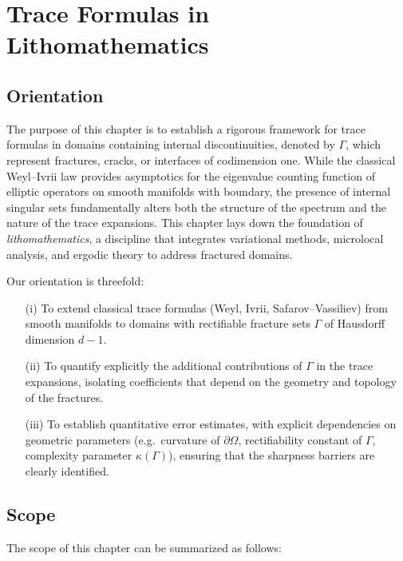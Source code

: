 \chapter{Trace Formulas in Lithomathematics}
\label{ch:trace-formulas}

\section*{Orientation}

The purpose of this chapter is to establish a rigorous framework for trace formulas
in domains containing internal discontinuities, denoted by $\Gamma$, which represent
fractures, cracks, or interfaces of codimension one. While the classical Weyl--Ivrii
law provides asymptotics for the eigenvalue counting function of elliptic operators
on smooth manifolds with boundary, the presence of internal singular sets fundamentally
alters both the structure of the spectrum and the nature of the trace expansions.
This chapter lays down the foundation of \emph{lithomathematics}, a discipline that
integrates variational methods, microlocal analysis, and ergodic theory to address
fractured domains.

Our orientation is threefold:

\begin{enumerate}
  \item[(i)] To extend classical trace formulas (Weyl, Ivrii, Safarov--Vassiliev) 
  from smooth manifolds to domains with rectifiable fracture sets $\Gamma$ of 
  Hausdorff dimension $d-1$.
  \item[(ii)] To quantify explicitly the additional contributions of $\Gamma$ in the
  trace expansions, isolating coefficients that depend on the geometry and topology
  of the fractures.
  \item[(iii)] To establish quantitative error estimates, with explicit dependencies
  on geometric parameters (e.g.\ curvature of $\partial\Omega$, rectifiability constant
  of $\Gamma$, complexity parameter $\kappa(\Gamma)$), ensuring that the sharpness
  barriers are clearly identified.
\end{enumerate}

\section*{Scope}

The scope of this chapter can be summarized as follows:

